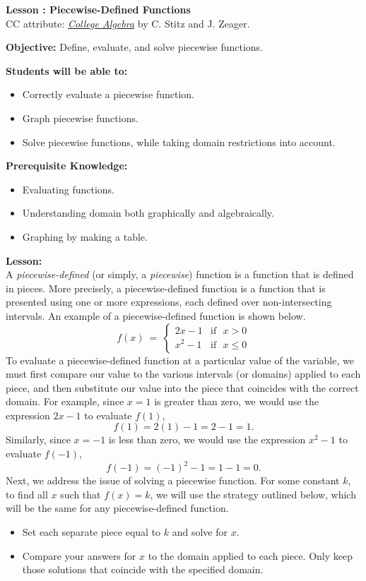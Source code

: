 \documentclass[12pt]{article}
\theoremstyle{definition}
\begin{document}
{\bf \large Lesson : Piecewise-Defined Functions}\label{les:piecewise_functions}
\\ CC attribute: \href{http://www.stitz-zeager.com}{\it{College Algebra}} by C. Stitz and J. Zeager. 
\hfill \doclicenseImage[imagewidth=5em]\\
\par
{\bf Objective:} Define, evaluate, and solve piecewise functions.\\
\par
{\bf Students will be able to:}
\begin{itemize}
	\item Correctly evaluate a piecewise function.
	\item Graph piecewise functions.
	\item Solve piecewise functions, while taking domain restrictions into account.
\end{itemize}
{\bf Prerequisite Knowledge:}
\begin{itemize}
	\item Evaluating functions.
	\item Understanding domain both graphically and algebraically.
	\item Graphing by making a table.
\end{itemize}
\hrulefill

{\bf Lesson:}\\
A {\it piecewise-defined} (or simply, a {\it piecewise}) function is a function that is defined in pieces.  More precisely, a piecewise-defined function is a function that is presented using one or more expressions, each defined over non-intersecting intervals.  An example of a piecewise-defined function is shown below.
\[ f(x)~=~
	\begin{cases} 
      2x-1 & \text{if~~} x> 0\\
			x^2-1 & \text{if~~} x\leq 0
  \end{cases}
\]
To evaluate a piecewise-defined function at a particular value of the variable, we must first compare our value to the various intervals (or domains) applied to each piece, and then substitute our value into the piece that coincides with the correct domain.  For example, since $x=1$ is greater than zero, we would use the expression $2x-1$ to evaluate $f(1)$,
$$f(1)=2(1)-1=2-1=1.$$
Similarly, since $x=-1$ is less than zero, we would use the expression $x^2-1$ to evaluate $f(-1)$,
$$f(-1)=(-1)^2-1=1-1=0.$$
Next, we address the issue of solving a piecewise function.  For some constant $k$, to find all $x$ such that $f(x)=k$, we will use the strategy outlined below, which will be the same for any piecewise-defined function.
	\begin{itemize}
		\item Set each separate piece equal to $k$ and solve for $x$.
		\item Compare your answers for $x$ to the domain applied to each piece.  Only keep those solutions that coincide with the specified domain.
	\end{itemize}
\end{document}
